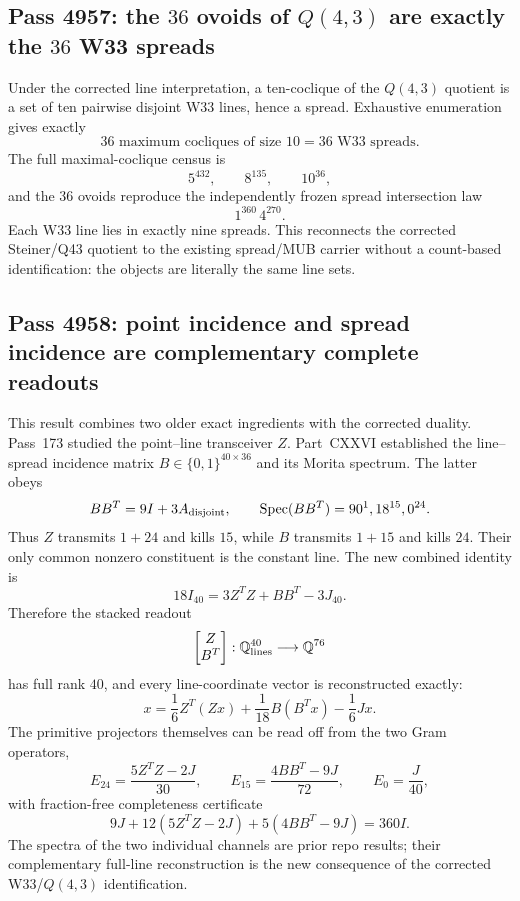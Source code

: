 \subsection{Pass 4957: the $36$ ovoids of $Q(4,3)$ are exactly the $36$ W33 spreads}
Under the corrected line interpretation, a ten-coclique of the $Q(4,3)$
quotient is a set of ten pairwise disjoint W33 lines, hence a spread.  Exhaustive
enumeration gives exactly
\[
 \boxed{36\text{ maximum cocliques of size }10=36\text{ W33 spreads}.}
\]
The full maximal-coclique census is
\[
 5^{432},\qquad8^{135},\qquad10^{36},
\]
and the $36$ ovoids reproduce the independently frozen spread intersection
law
\[
 \boxed{1^{360}\,4^{270}}.
\]
Each W33 line lies in exactly nine spreads.  This reconnects the corrected
Steiner/Q43 quotient to the existing spread/MUB carrier without a count-based
identification: the objects are literally the same line sets.

\subsection{Pass 4958: point incidence and spread incidence are complementary complete readouts}
This result combines two older exact ingredients with the corrected duality.
Pass~173 studied the point--line transceiver $Z$.  Part~CXXVI established the
line--spread incidence matrix $B\in\{0,1\}^{40\times36}$ and its Morita
spectrum.  The latter obeys
\[
 BB^T=9I+3A_{\rm disjoint},
 \qquad \operatorname{Spec}(BB^T)=90^1,18^{15},0^{24}.
\]
Thus $Z$ transmits $1+24$ and kills $15$, while $B$ transmits $1+15$ and
kills $24$.  Their only common nonzero constituent is the constant line.
The new combined identity is
\[
 \boxed{18I_{40}=3Z^TZ+BB^T-3J_{40}.}
\]
Therefore the stacked readout
\[
 \begin{bmatrix}Z\\B^T\end{bmatrix}:\mathbb Q^{40}_{\rm lines}
 \longrightarrow\mathbb Q^{76}
\]
has full rank $40$, and every line-coordinate vector is reconstructed exactly:
\[
 \boxed{x=\frac16Z^T(Zx)+\frac1{18}B(B^Tx)-\frac16Jx.}
\]
The primitive projectors themselves can be read off from the two Gram
operators,
\[
 E_{24}=\frac{5Z^TZ-2J}{30},\qquad
 E_{15}=\frac{4BB^T-9J}{72},\qquad
 E_0=\frac{J}{40},
\]
with fraction-free completeness certificate
\[
 9J+12(5Z^TZ-2J)+5(4BB^T-9J)=360I.
\]
The spectra of the two individual channels are prior repo results; their
complementary full-line reconstruction is the new consequence of the corrected
W33/$Q(4,3)$ identification.

